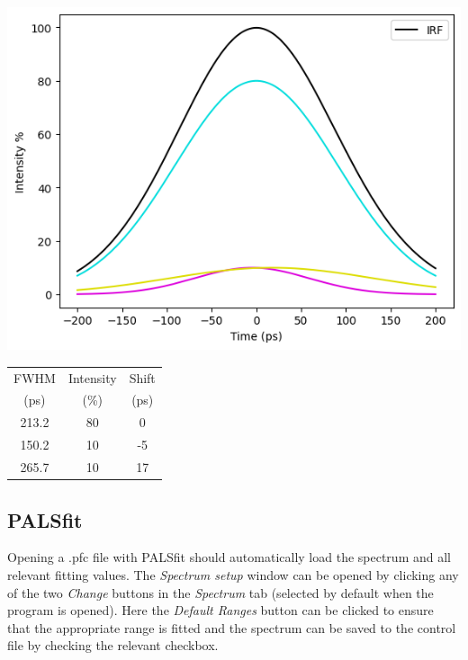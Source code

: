 \begin{minipage}{0.6\textwidth}
    \includegraphics[width=\textwidth]{Batch 3/regular IRF/irf.png}
\end{minipage}
\begin{minipage}{0.35\textwidth}
    \centering
    \label{tab:irfcomp}
    \begin{tabular}{|c|c|c|}
        \hline
        FWHM& Intensity& Shift \\
        (ps) & (\%) & (ps)\\
        \hline
        213.2 & 80 &  0\\
        150.2 & 10 & -5\\
        265.7 & 10 & 17\\
        \hline
    \end{tabular}
    \vspace{1cm}
    \label{fig:irf}
\end{minipage}

\subsection{PALSfit}

Opening a .pfc file with PALSfit should automatically load the spectrum and all relevant fitting values. The \textit{Spectrum setup} window can be opened by clicking any of the two \textit{Change} buttons in the \textit{Spectrum} tab (selected by default when the program is opened). Here the \textit{Default Ranges} button can be clicked to ensure that the appropriate range is fitted and the spectrum can be saved to the control file by checking the relevant checkbox.

